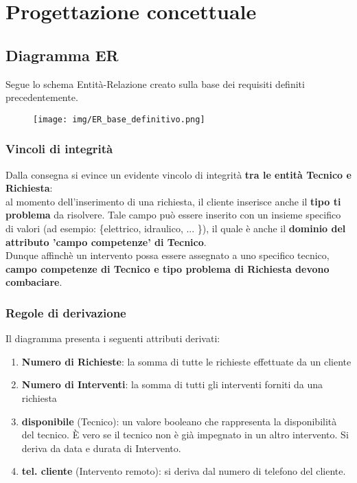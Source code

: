 \documentclass{article}
\begin{document}
\section{Progettazione concettuale}

\subsection{Diagramma ER}
Segue lo schema Entità-Relazione creato sulla base dei requisiti definiti precedentemente.

\begin{figure}[h]
    \centering
    \texttt{[image: img/ER\_base\_definitivo.png]}
    \label{fig:ER_Schema1}
\end{figure}

    \subsubsection{Vincoli di integrità}
    Dalla consegna si evince un evidente vincolo di integrità \textbf{tra le entità Tecnico e Richiesta}: \\ al momento dell'inserimento di una richiesta, il cliente inserisce anche il \textbf{tipo ti problema} da risolvere. Tale campo può essere inserito con un insieme specifico di valori (ad esempio: \{elettrico, idraulico, ... \}), il quale è anche il \textbf{dominio del attributo 'campo competenze' di Tecnico}. \\ Dunque affinchè un intervento possa essere assegnato a uno specifico tecnico, \textbf{campo competenze di Tecnico e tipo problema di Richiesta devono combaciare}.
    
    \subsubsection{Regole di derivazione}
    
    Il diagramma presenta i seguenti attributi derivati:
    \begin{enumerate}
        \item \textbf{Numero di Richieste}: la somma di tutte le richieste effettuate da un cliente
        \item \textbf{Numero di Interventi}: la somma di tutti gli interventi forniti da una richiesta
        \item \textbf{disponibile} (Tecnico): un valore booleano che rappresenta la disponibilità del tecnico. È vero se il tecnico non è già impegnato in un altro intervento. Si deriva da data e durata di Intervento.
        \item \textbf{tel. cliente} (Intervento remoto): si deriva dal numero di telefono del cliente.
    \end{enumerate}
\end{document}
